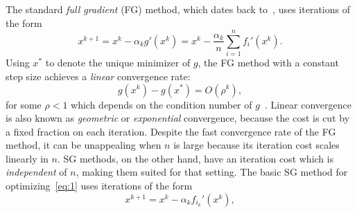\documentclass{article}
\newcommand{\mysec}[1]{Section~\ref{sec:#1}}
\begin{document}
The standard \emph{full gradient} (FG) method, which dates back to~\cite{cauchy1847methode}, uses iterations
of the form
\begin{equation}
\label{eq:FG}
x^{k+1} = x^k - \alpha_kg'(x^k) = x^k - \frac{\alpha_k}{n}\sum_{i=1}^nf_i'(x^k).
\end{equation}
Using $x^\ast$ to denote the unique minimizer of $g$, the FG method with a constant  step size achieves a \emph{linear} convergence rate:
\[
g(x^k) - g(x^\ast) = O(\rho^k),
\]
for some $\rho < 1$ which depends on the condition number of $g$~\cite[Theorem 2.1.15]{nesterov2004introductory}.  Linear
convergence is also known as \emph{geometric} or \emph{exponential}
convergence, because the cost is cut by a fixed fraction on each iteration.
Despite the fast convergence rate of the FG method, it can be unappealing
when $n$ is large because its iteration cost scales linearly in $n$. 
%
SG methods, on the other hand, have an iteration cost which is \emph{independent} of $n$, making them suited for that setting. The basic SG method for optimizing~\eqref{eq:1} uses iterations of the form
\begin{equation}
\label{eq:SG}
x^{k+1} = x^k - \alpha_kf_{i_k}'(x^k),
\end{equation}
\end{document}
